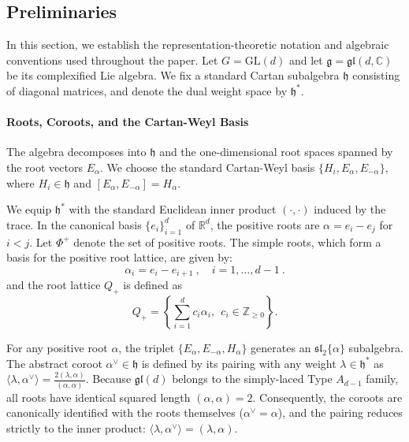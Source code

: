 \documentclass[11pt,letterpaper]{article}
\begin{document}
\subsection{Preliminaries}

In this section, we establish the representation-theoretic notation and algebraic conventions used throughout the paper. Let $G = \mathrm{GL}(d)$ and let $\mathfrak{g} = \mathfrak{gl}(d, \mathbb{C})$ be its complexified Lie algebra. We fix a standard Cartan subalgebra $\mathfrak{h}$ consisting of diagonal matrices, and denote the dual weight space by $\mathfrak{h}^*$. 

\paragraph{Roots, Coroots, and the Cartan-Weyl Basis}
The algebra decomposes into $\mathfrak{h}$ and the one-dimensional root spaces spanned by the root vectors $E_\alpha$. We choose the standard Cartan-Weyl basis $\{H_i, E_\alpha, E_{-\alpha}\}$, where $H_i \in \mathfrak{h}$ and $[E_\alpha, E_{-\alpha}] = H_\alpha$. 

We equip $\mathfrak{h}^*$ with the standard Euclidean inner product $(\cdot, \cdot)$ induced by the trace. In the canonical basis $\{e_i\}_{i=1}^d$ of $\mathbb{R}^d$, the positive roots are $\alpha = e_i - e_j$ for $i < j$. Let $\Phi^+$ denote the set of positive roots. The simple roots, which form a basis for the positive root lattice, are given by:
\begin{equation}
    \alpha_i = e_i - e_{i+1} \ , \quad i = 1, \dots, d-1 \ .
\end{equation}
and the root lattice $Q_+$ is defined as
\begin{equation}
    Q_+ = \left\{\sum_{i=1}^dc_i\alpha_i,\ \ c_i\in\mathbb Z_{\ge 0}\right\} .
\end{equation}


For any positive root $\alpha$, the triplet $\{E_\alpha, E_{-\alpha}, H_\alpha\}$ generates an $\mathfrak{sl}_2\{\alpha\}$ subalgebra. The abstract coroot $\alpha^\vee \in \mathfrak{h}$ is defined by its pairing with any weight $\lambda \in \mathfrak{h}^*$ as $\langle \lambda, \alpha^\vee \rangle = \frac{2(\lambda, \alpha)}{(\alpha, \alpha)}$. Because $\mathfrak{gl}(d)$ belongs to the simply-laced Type $A_{d-1}$ family, all roots have identical squared length $(\alpha, \alpha) = 2$. Consequently, the coroots are canonically identified with the roots themselves ($\alpha^\vee = \alpha$), and the pairing reduces strictly to the inner product: $\langle \lambda, \alpha^\vee \rangle = (\lambda, \alpha)$. 
\end{document}
